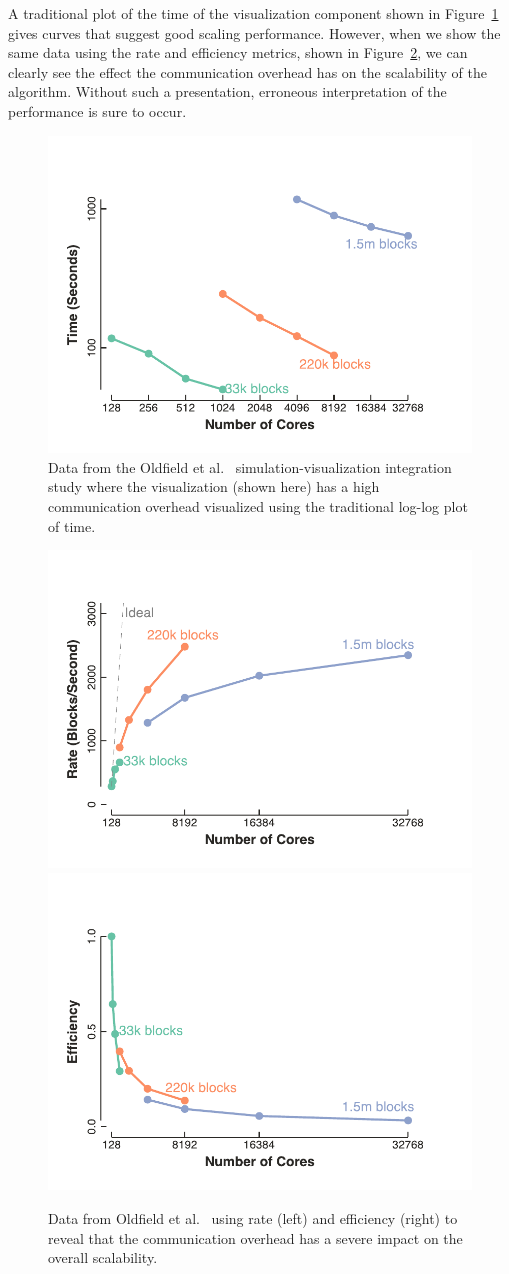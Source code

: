 \documentclass{llncs}
\newcommand*{\scite}[1]{~\cite{#1}}
\newcommand{\etal}{et al.\xspace}
\begin{document}
A traditional plot of the time of the visualization component shown in
Figure~\ref{fig:OldfieldTraditional} gives curves that suggest good scaling
performance. However, when we show the same data using the rate and
efficiency metrics, shown in Figure~\ref{fig:OldfieldBetter}, we can
clearly see the effect the communication overhead has on the scalability of
the algorithm. Without such a presentation, erroneous interpretation of the
performance is sure to occur.

\begin{figure}[htb]
  \centering
  \includegraphics[width=.48\linewidth]{images/OldfieldTimeLog}
  \caption{Data from the Oldfield \etal\scite{Oldfield2014,Rogers2013}
    simulation-visualization integration study where the visualization
    (shown here) has a high communication overhead visualized using the
    traditional log-log plot of time.}
  \label{fig:OldfieldTraditional}
\end{figure}

\begin{figure}
  \centering
  \includegraphics[width=.48\linewidth]{images/OldfieldRate}\quad
  \includegraphics[width=.48\linewidth]{images/OldfieldEfficiency}
  \caption{Data from Oldfield \etal\scite{Oldfield2014,Rogers2013} using
    rate (left) and efficiency (right) to reveal that the communication
    overhead has a severe impact on the overall scalability.}
  \label{fig:OldfieldBetter}
\end{figure}
\end{document}
